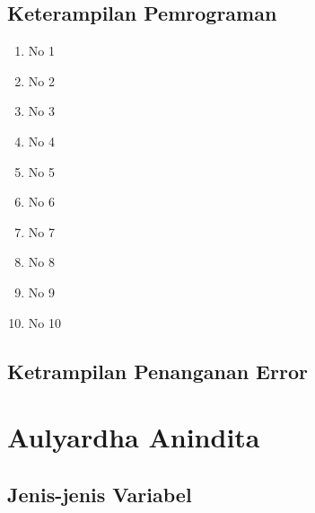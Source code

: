 \subsection{Keterampilan Pemrograman}
\begin{enumerate}
	\item No 1
	
	
	\item No 2
	
	
	\item No 3
	
	
	\item No 4
	
	
	\item No 5
	
	
	\item No 6
	
	
	\item No 7
	
	
	\item No 8
	
	
	\item No 9
	
	
	\item No 10
	
	
\end{enumerate}


\subsection{Ketrampilan Penanganan Error}


\section{Aulyardha Anindita}
\subsection{Jenis-jenis Variabel}
